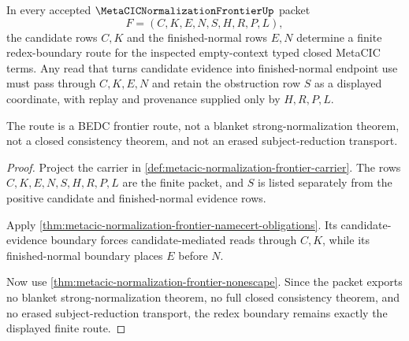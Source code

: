 \begin{theorem}
\label{thm:metacic-normalization-frontier-redex-boundary}
In every accepted $\MetaCICNormalizationFrontierUp$ packet
$$
F=(C,K,E,N,S,H,R,P,L),
$$
the candidate rows $C,K$ and the finished-normal rows $E,N$ determine a finite redex-boundary route for the inspected empty-context typed closed MetaCIC terms. Any read that turns candidate evidence into finished-normal endpoint use must pass through $C,K,E,N$ and retain the obstruction row $S$ as a displayed coordinate, with replay and provenance supplied only by $H,R,P,L$.

The route is a BEDC frontier route, not a blanket strong-normalization theorem, not a closed consistency theorem, and not an erased subject-reduction transport.
\end{theorem}
\begin{proof}
Project the carrier in \autoref{def:metacic-normalization-frontier-carrier}. The rows $C,K,E,N,S,H,R,P,L$ are the finite packet, and $S$ is listed separately from the positive candidate and finished-normal evidence rows.

Apply \autoref{thm:metacic-normalization-frontier-namecert-obligations}. Its candidate-evidence boundary forces candidate-mediated reads through $C,K$, while its finished-normal boundary places $E$ before $N$.

Now use \autoref{thm:metacic-normalization-frontier-nonescape}. Since the packet exports no blanket strong-normalization theorem, no full closed consistency theorem, and no erased subject-reduction transport, the redex boundary remains exactly the displayed finite route.
\end{proof}

